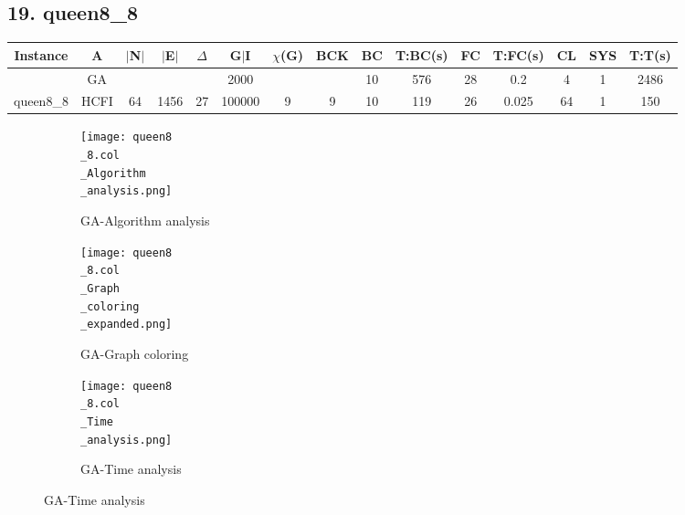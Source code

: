 \documentclass[10pt]{article}
\begin{document}
\subsection*{\hspace{0,9073976cm} 19. queen8\_8}
\begin{table}[H]
\centering
\begin{tabular}{|c|c|c|c|c|c|c|c|c|c|c|c|c|c|c|}
\hline
Instance& A &$|$N$|$ & $|$E$|$ & $\Delta$ & G$|$I & $\chi$(G) &BCK&BC & T:BC(s) & FC & T:FC(s) & CL & SYS & T:T(s) \\ \hline \hline
	&GA&       &                   &                     &2000         &     \cellcolor{yellow} & {\cellcolor{yellow}}& {{\cellcolor{green}10}}
& 576  & 28       & 0.2                  &4                    & 1         &2486         \\ \cline{2-2} \cline{6-6} \cline{9-15}
 \multirow{-2}{*}{queen8\_8} &HCFI   &\multirow{-2}{*}{64}   &\multirow{-2}{*}{1456}     &\multirow{-2}{*}{27}     &100000     &\multirow{-2}{*}{\cellcolor{yellow}9}      & \multirow{-2}{*}{\cellcolor{yellow}9}    &{\cellcolor{green}10}     &119         &26    &0.025         &64    &1     &150        \\ \hline 
\end{tabular}
\end{table}
\graphicspath{{./Core1/Solutions/GA/queen8\_8.col}}
\begin{figure}[H]
\begin{subfigure}{.33\textwidth}
  \centering
  \texttt{[image: queen8\\\_8.col\\\_Algorithm\\\_analysis.png]}
  \caption{GA-Algorithm analysis}
   \label{fig:subfig1}
\end{subfigure}%
\begin{subfigure}{.33\textwidth}
  \centering
  \texttt{[image: queen8\\\_8.col\\\_Graph\\\_coloring\\\_expanded.png]}
  \caption{GA-Graph coloring}
  \label{fig:subfig2}
\end{subfigure}
\begin{subfigure}{.33\textwidth}
  \centering
  \texttt{[image: queen8\\\_8.col\\\_Time\\\_analysis.png]}
  \caption{GA-Time analysis}
  \end{subfigure}
\end{figure}
\end{document}
